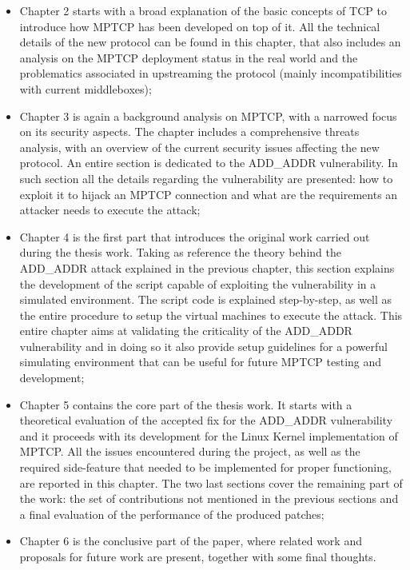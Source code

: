 \begin{itemize}
  \item Chapter 2 starts with a broad explanation of the basic concepts of TCP to introduce how MPTCP has been developed on top of it. All the technical details of the new protocol can be found in this chapter, that also includes an analysis on the MPTCP deployment status in the real world and the problematics associated in upstreaming the protocol (mainly incompatibilities with current middleboxes);
  \item Chapter 3 is again a background analysis on MPTCP, with a narrowed focus on its security aspects. The chapter includes a comprehensive threats analysis, with an overview of the current security issues affecting the new protocol. An entire section is dedicated to the ADD\_ADDR vulnerability. In such section all the details regarding the vulnerability are presented: how to exploit it to hijack an MPTCP connection and what are the requirements  an attacker needs to execute the attack;
  \item Chapter 4 is the first part that introduces the original work carried out during the thesis work. Taking as reference the theory behind the ADD\_ADDR attack explained in the previous chapter, this section explains the development of the script capable of exploiting the vulnerability in a simulated environment. The script code is explained step-by-step, as well as the entire procedure to setup the virtual machines to execute the attack. This entire chapter aims at validating the criticality of the ADD\_ADDR vulnerability and in doing so it also provide setup guidelines for a powerful simulating environment that can be useful for future MPTCP testing and development;
  \item Chapter 5 contains the core part of the thesis work. It starts with a theoretical evaluation of the accepted fix for the ADD\_ADDR vulnerability and it proceeds with its development for the Linux Kernel implementation of MPTCP. All the issues encountered during the project, as well as the required side-feature that needed to be implemented for proper functioning, are reported in this chapter. The two last sections cover the remaining part of the work: the set of contributions not mentioned in the previous sections and a final evaluation of the performance of the produced patches;
  \item Chapter 6 is the conclusive part of the paper, where related work and proposals for future work are present, together with some final thoughts.
\end{itemize}